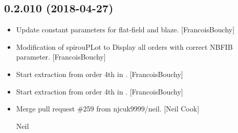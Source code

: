 \documentclass[a4paper,10pt,english]{report}
\begin{document}
\subsection{0.2.010 (2018-04-27)}
\label{\detokenize{misc/changelog:id450}}\begin{itemize}
\item {} 
Update constant parameters for flat-field and blaze. {[}FrancoisBouchy{]}

\item {} 
Modification of spirouPLot to Display all orders with correct NBFIB
parameter. {[}FrancoisBouchy{]}

\item {} 
Start extraction from order 4th in .
{[}FrancoisBouchy{]}

\item {} 
Start extraction from order 4th in . {[}FrancoisBouchy{]}

\item {} 
Merge pull request \#259 from njcuk9999/neil. {[}Neil Cook{]}

Neil

\end{itemize}
\end{document}
